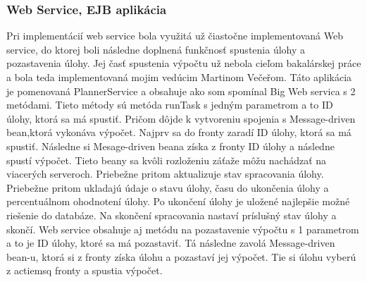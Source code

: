 \subsubsection{Web Service, EJB aplikácia}
Pri implementácií web service bola využitá už čiastočne implementovaná Web service, do ktorej boli následne doplnená funkčnosť spustenia úlohy a pozastavenia úlohy. Jej časť spustenia výpočtu už nebola cieľom bakalárskej práce a bola teda implementovaná mojim vedúcim Martinom Večeřom.
Táto aplikácia je pomenovaná PlannerService a obsahuje ako som spomínal Big Web servica s 2 metódami. Tieto métody sú metóda runTask s jedným parametrom a to ID úlohy, ktorá sa má spustiť. Pričom dôjde k vytvoreniu spojenia s Message-driven bean,ktorá vykonáva výpočet. Najprv sa do fronty zaradí ID úlohy, ktorá sa má spustiť. Následne si Mesage-driven beana získa z fronty ID úlohy a následne spustí výpočet. Tieto beany sa kvôli rozloženiu záťaže môžu nachádzať na viacerých serveroch. Priebežne pritom aktualizuje stav spracovania úlohy. Priebežne pritom ukladajú údaje o stavu úlohy, času do ukončenia úlohy a percentuálnom ohodnotení úlohy. Po ukončení úlohy je uložené najlepšie možné riešenie do databáze. Na skončení spracovania nastaví príslušný stav úlohy a skončí. Web service obsahuje aj metódu na pozastavenie výpočtu s 1 parametrom a to je ID úlohy, ktoré sa má pozastaviť. Tá následne zavolá Message-driven bean-u, ktorá si z fronty získa úlohu a pozastaví jej výpočet. Tie si úlohu vyberú z actiemsq fronty a spustia výpočet. 
	
	



